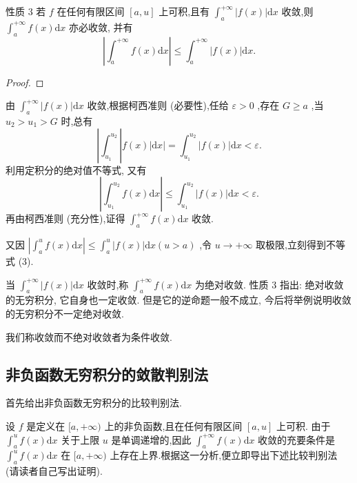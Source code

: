 性质 3 若 \(f\) 在任何有限区间 \(\left\lbrack  {a,u}\right\rbrack\) 上可积,且有 \({\int }_{a}^{+\infty }\left| {f\left( x\right) }\right| \mathrm{d}x\) 收敛,则 \({\int }_{a}^{+\infty }f\left( x\right) \mathrm{d}x\) 亦必收敛, 并有
\[
\left| {{\int }_{a}^{+\infty }f\left( x\right) \mathrm{d}x}\right|  \leq  {\int }_{a}^{+\infty }\left| {f\left( x\right) }\right| \mathrm{d}x. \tag{3}
\]
\begin{proof}

\end{proof}
由 \({\int }_{a}^{+\infty }\left| {f\left( x\right) }\right| \mathrm{d}x\) 收敛,根据柯西准则 (必要性),任给 \(\varepsilon  > 0\) ,存在 \(G \geq  a\) ,当 \({u}_{2} > {u}_{1} > G\) 时,总有
\[
\left| {\int }_{{u}_{1}}^{{u}_{2}}\right| f\left( x\right) \left| {\mathrm{d}x}\right|  = {\int }_{{u}_{1}}^{{u}_{2}}\left| {f\left( x\right) }\right| \mathrm{d}x < \varepsilon .
\]
利用定积分的绝对值不等式, 又有
\[
\left| {{\int }_{{u}_{1}}^{{u}_{2}}f\left( x\right) \mathrm{d}x}\right|  \leq  {\int }_{{u}_{1}}^{{u}_{2}}\left| {f\left( x\right) }\right| \mathrm{d}x < \varepsilon .
\]
再由柯西准则 (充分性),证得 \({\int }_{a}^{+\infty }f\left( x\right) \mathrm{d}x\) 收敛.

又因 \(\left| {{\int }_{a}^{u}f\left( x\right) \mathrm{d}x}\right|  \leq  {\int }_{a}^{u}\left| {f\left( x\right) }\right| \mathrm{d}x\left( {u > a}\right)\) ,令 \(u \rightarrow   + \infty\) 取极限,立刻得到不等式 (3).

当 \({\int }_{a}^{+\infty }\left| {f\left( x\right) }\right| \mathrm{d}x\) 收敛时,称 \({\int }_{a}^{+\infty }f\left( x\right) \mathrm{d}x\) 为绝对收敛. 性质 3 指出: 绝对收敛的无穷积分, 它自身也一定收敛. 但是它的逆命题一般不成立, 今后将举例说明收敛的无穷积分不一定绝对收敛.

我们称收敛而不绝对收敛者为条件收敛.

\subsection{非负函数无穷积分的敛散判别法}

首先给出非负函数无穷积分的比较判别法.

设 \(f\) 是定义在 \(\lbrack a, + \infty )\) 上的非负函数,且在任何有限区间 \(\left\lbrack  {a,u}\right\rbrack\) 上可积. 由于 \({\int }_{a}^{u}f\left( x\right) \mathrm{d}x\) 关于上限 \(u\) 是单调递增的,因此 \({\int }_{a}^{+\infty }f\left( x\right) \mathrm{d}x\) 收敛的充要条件是 \({\int }_{a}^{u}f\left( x\right) \mathrm{d}x\) 在 \(\lbrack a, + \infty )\) 上存在上界.根据这一分析,便立即导出下述比较判别法 (请读者自己写出证明).

